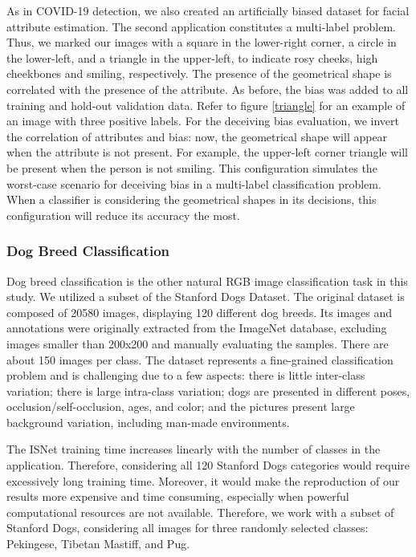 \documentclass[fleqn,10pt]{wlscirep}
\begin{document}
{As in COVID-19 detection, we also created an artificially biased dataset for facial attribute estimation. The second application constitutes a multi-label problem. Thus, we marked our images with a square in the lower-right corner, a circle in the lower-left, and a triangle in the upper-left, to indicate rosy cheeks, high cheekbones and smiling, respectively. The presence of the geometrical shape is correlated with the presence of the attribute. As before, the bias was added to all training and hold-out validation data. Refer to figure \ref{triangle} for an example of an image with three positive labels. For the deceiving bias evaluation, we invert the correlation of attributes and bias: now, the geometrical shape will appear when the attribute is not present. For example, the upper-left corner triangle will be present when the person is not smiling. This configuration simulates the worst-case scenario for deceiving bias in a multi-label classification problem. When a classifier is considering the geometrical shapes in its decisions, this configuration will reduce its accuracy the most.

\subsubsection{Dog Breed Classification}

Dog breed classification is the other natural RGB image classification task in this study. We utilized a subset of the Stanford Dogs Dataset\cite{StanfordDogs}. The original dataset is composed of 20580 images, displaying 120 different dog breeds. Its images and annotations were originally extracted from the ImageNet database\cite{imagenet}, excluding images smaller than 200x200\cite{StanfordDogs} and manually evaluating the samples. There are about 150 images per class. The dataset represents a fine-grained classification problem and is challenging due to a few aspects: there is little inter-class variation; there is large intra-class variation; dogs are presented in different poses, occlusion/self-occlusion, ages, and color; and the pictures present large background variation, including man-made environments\cite{StanfordDogs}.

The ISNet training time increases linearly with the number of classes in the application. Therefore, considering all 120 Stanford Dogs categories would require excessively long training time. Moreover, it would make the reproduction of our results more expensive and time consuming, especially when powerful computational resources are not available. Therefore, we work with a subset of Stanford Dogs, considering all images for three randomly selected classes: Pekingese, Tibetan Mastiff, and Pug.

}
\end{document}
